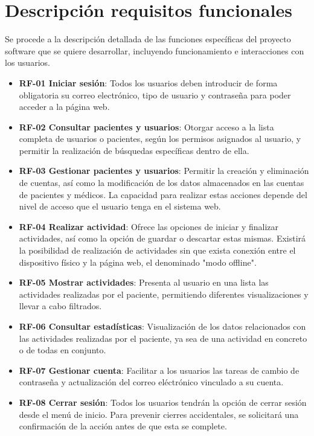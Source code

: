 

\section{Descripción requisitos funcionales}
Se procede a la descripción detallada de las funciones específicas del proyecto software que se quiere desarrollar, incluyendo funcionamiento e interacciones con los usuarios.

\begin{itemize}
    \item \textbf{RF-01 Iniciar sesión}: Todos los usuarios deben introducir de forma obligatoria su correo electrónico, tipo de usuario y contraseña para poder acceder a la página web.
    \item \textbf{RF-02 Consultar pacientes y usuarios}: Otorgar acceso a la lista completa de usuarios o pacientes, según los permisos asignados al usuario, y permitir la realización de búsquedas específicas dentro de ella.
    \item \textbf{RF-03 Gestionar pacientes y usuarios}: Permitir la creación y eliminación de cuentas, así como la modificación de los datos almacenados en las cuentas de pacientes y médicos. La capacidad para realizar estas acciones depende del nivel de acceso que el usuario tenga en el sistema web.
    \item \textbf{RF-04 Realizar actividad}: Ofrece las opciones de iniciar y finalizar actividades, así como la opción de guardar o descartar estas mismas. Existirá la posibilidad de realización de actividades sin que exista conexión entre el dispositivo físico y la página web, el denominado "modo offline".
    \item \textbf{RF-05 Mostrar actividades}: Presenta al usuario en una lista las actividades realizadas por el paciente, permitiendo diferentes visualizaciones y llevar a cabo filtrados.
    \item \textbf{RF-06 Consultar estadísticas}: Visualización de los datos relacionados con las actividades realizadas por el paciente, ya sea de una actividad en concreto o de todas en conjunto.
    \item \textbf{RF-07 Gestionar cuenta}: Facilitar a los usuarios las tareas de cambio de contraseña y actualización del correo eléctrónico vinculado a su cuenta.
    \item \textbf{RF-08 Cerrar sesión}: Todos los usuarios tendrán la opción de cerrar sesión desde el menú de inicio. Para prevenir cierres accidentales, se solicitará una confirmación de la acción antes de que esta se complete.
\end{itemize}


